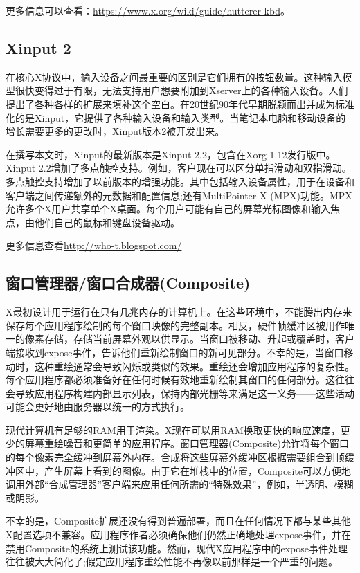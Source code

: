 \noindent 更多信息可以查看：\url{https://www.x.org/wiki/guide/hutterer-kbd}。

\subsection{Xinput 2}

在核心X协议中，输入设备之间最重要的区别是它们拥有的按钮数量。这种输入模型很快变得过于有限，无法支持用户想要附加到Xserver上的各种输入设备。人们提出了各种各样的扩展来填补这个空白。在20世纪90年代早期脱颖而出并成为标准化的是Xinput，它提供了各种输入设备和输入类型。当笔记本电脑和移动设备的增长需要更多的更改时，Xinput版本2被开发出来。

在撰写本文时，Xinput的最新版本是Xinput 2.2，包含在Xorg 1.12发行版中。Xinput 2.2增加了多点触控支持。例如，客户现在可以区分单指滑动和双指滑动。多点触控支持增加了以前版本的增强功能。其中包括输入设备属性，用于在设备和客户端之间传递额外的元数据和配置信息;还有MultiPointer X (MPX)功能。MPX允许多个X用户共享单个X桌面。每个用户可能有自己的屏幕光标图像和输入焦点，由他们自己的鼠标和键盘设备驱动。

\noindent 更多信息查看\url{http://who-t.blogspot.com/}

\subsection{窗口管理器/窗口合成器(Composite)}

X最初设计用于运行在只有几兆内存的计算机上。在这些环境中，不能腾出内存来保存每个应用程序绘制的每个窗口映像的完整副本。相反，硬件帧缓冲区被用作唯一的像素存储，存储当前屏幕外观以供显示。当窗口被移动、升起或覆盖时，客户端接收到expose事件，告诉他们重新绘制窗口的新可见部分。不幸的是，当窗口移动时，这种重绘通常会导致闪烁或类似的效果。重绘还会增加应用程序的复杂性。每个应用程序都必须准备好在任何时候有效地重新绘制其窗口的任何部分。这往往会导致应用程序构建内部显示列表，保持内部光栅等来满足这一义务——这些活动可能会更好地由服务器以统一的方式执行。

现代计算机有足够的RAM用于渲染。X现在可以用RAM换取更快的响应速度，更少的屏幕重绘噪音和更简单的应用程序。窗口管理器(Composite)允许将每个窗口的每个像素完全缓冲到屏幕外内存。合成将这些屏幕外缓冲区根据需要组合到帧缓冲区中，产生屏幕上看到的图像。由于它在堆栈中的位置，Composite可以方便地调用外部“合成管理器”客户端来应用任何所需的“特殊效果”，例如，半透明、模糊或阴影。

不幸的是，Composite扩展还没有得到普遍部署，而且在任何情况下都与某些其他X配置选项不兼容。应用程序作者必须确保他们仍然正确地处理expose事件，并在禁用Composite的系统上测试该功能。然而，现代X应用程序中的expose事件处理往往被大大简化了;假定应用程序重绘性能不再像以前那样是一个严重的问题。


